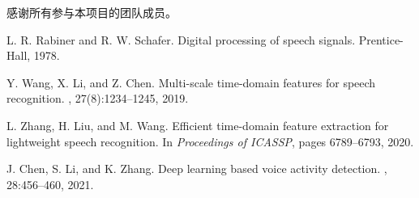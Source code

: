 \documentclass[sigconf,nonacm]{acmart}
\begin{document}
感谢所有参与本项目的团队成员。

\begin{thebibliography}{9}

L. R. Rabiner and R. W. Schafer.
\newblock Digital processing of speech signals.
\newblock Prentice-Hall, 1978.

Y. Wang, X. Li, and Z. Chen.
\newblock Multi-scale time-domain features for speech recognition.
, 27(8):1234--1245, 2019.

L. Zhang, H. Liu, and M. Wang.
\newblock Efficient time-domain feature extraction for lightweight speech recognition.
\newblock In {\em Proceedings of ICASSP}, pages 6789--6793, 2020.

J. Chen, S. Li, and K. Zhang.
\newblock Deep learning based voice activity detection.
, 28:456--460, 2021.

\end{thebibliography}
\end{document}
